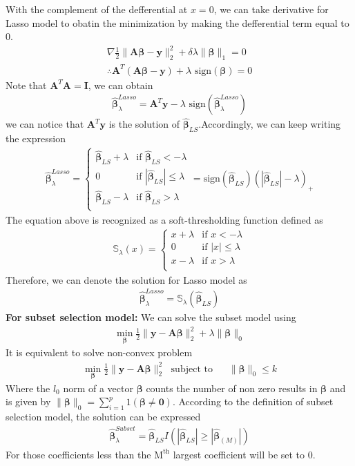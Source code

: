 \documentclass[11pt]{article}
\newcommand{\st}{\operatorname*{\ subject\ to\ }}
\newcommand{\mtx}[1]{\mathbf{#1}}
\newcommand{\vct}[1]{\mathbf{#1}}
\def \mA {\mtx{A}}
\def \mI {\mtx{I}}
\def \vy {\vct{y}}
\begin{document}
With the complement of the defferential at $x=0$, we can take derivative for Lasso model to obatin the minimization by making the defferential term equal to 0.
\begin{align*}
	\nabla \frac{1}{2}\|\mA\bm{\beta}-\vy\|^2_2+\delta\lambda\|\bm{\beta}\|_1=0\\
	\therefore \mA^{T}(\mA\bm{\beta}-\vy)+\lambda \text{ sign}(\bm{\beta})=0
\end{align*}
Note that $\mA^{T}\mA=\mI$, we can obtain
\begin{align*}
	\hat{\bm{\beta}}^{Lasso}_\lambda=\mA^T\vy-\lambda \text{ sign}(\hat{\bm{\beta}}^{Lasso}_\lambda)
\end{align*}
we can notice that $\mA^T\vy$ is the solution of $\hat{\bm{\beta}}_{LS}$.Accordingly, we can keep writing the expression
\begin{align}\label{eq:3:4}
	\hat{\bm{\beta}}^{Lasso}_\lambda=
	\begin{cases}
	\hat{\bm{\beta}}_{LS}+\lambda & \text{if } \hat{\bm{\beta}}_{LS} < -\lambda\\
	0 & \text{if } |\hat{\bm{\beta}}_{LS}| \leq \lambda\\
	\hat{\bm{\beta}}_{LS}-\lambda & \text{if } \hat{\bm{\beta}}_{LS} > \lambda\\
	\end{cases}=\text{sign}(\hat{\bm{\beta}}_{LS})(|\hat{\bm{\beta}}_{LS}|-\lambda)_+
\end{align}
The equation above is recognized as a soft-thresholding function defined as
\begin{align*}
\mathbb{S}_{\lambda}(x)=
\begin{cases}
x+\lambda & \text{if } x<-\lambda\\
0 & \text{if } |x|\leq\lambda\\
x-\lambda & \text{if } x>\lambda\\
\end{cases}
\end{align*}
Therefore, we can denote the solution for Lasso model as
\begin{align}\label{eq:3:5}
\hat{\bm{\beta}}^{Lasso}_\lambda=\mathbb{S}_{\lambda}(\hat{\bm{\beta}}_{LS})
\end{align}
{\bf For subset selection model:}
We can solve the subset model using
\begin{align*}
	\min_{\bm{\beta}} \frac{1}{2} \|\vy-\mA\bm{\beta}\|_2^2 + 
	\lambda\|\bm{\beta}\|_0
\end{align*}
It is equivalent to solve non-convex problem
\begin{align*}
\min_{\bm{\beta}} \frac{1}{2} \|\vy-\mA\bm{\beta}\|_2^2 \st & \ \|\bm{\beta}\|_0 \leq k
\end{align*}
Where the $l_0$ norm of a vector $\bm{\beta}$ counts the number of non zero results in $\bm{\beta}$ and is given by $\|\bm{\beta}\|_0=\sum_{i=1}^{p}1(\bm{\beta\neq 0})$. According to the definition of subset selection model, the solution can be expressed
\begin{align}
	\hat{\bm{\beta}}_{\lambda}^{Subset}=\hat{\bm{\beta}}_{LS}I(|\hat{\bm{\beta}}_{LS}|\geq|\hat{\bm{\beta}}_{(M)}|)
\end{align}
For those coefficients less than the $\text{M}^{\text{th}}$ largest coefficient will be set to 0.
\end{document}
